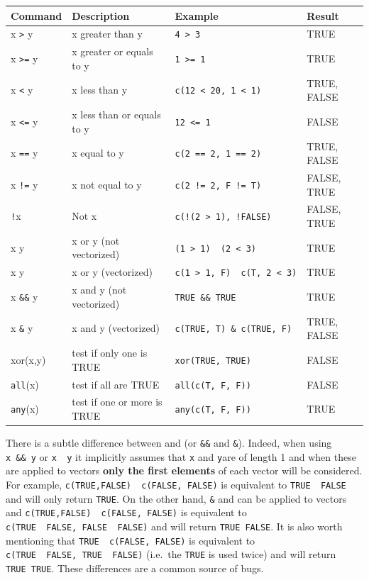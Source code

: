 \documentclass[12pt,]{krantz}
\let\BeginKnitrBlock\begin \let\EndKnitrBlock\end
\begin{document}
\begin{longtable}[]{@{}llll@{}}
\toprule
Command & Description & Example & Result\tabularnewline
\midrule
\endhead
x \texttt{\textgreater{}} y & x greater than y &
\texttt{4\ \textgreater{}\ 3} & TRUE\tabularnewline
x \texttt{\textgreater{}=} y & x greater or equals to y &
\texttt{1\ \textgreater{}=\ 1} & TRUE\tabularnewline
x \texttt{\textless{}} y & x less than y &
\texttt{c(12\ \textless{}\ 20,\ 1\ \textless{}\ 1)} & TRUE,
FALSE\tabularnewline
x \texttt{\textless{}=} y & x less than or equals to y &
\texttt{12\ \textless{}=\ 1} & FALSE\tabularnewline
x \texttt{==} y & x equal to y & \texttt{c(2\ ==\ 2,\ 1\ ==\ 2)} & TRUE,
FALSE\tabularnewline
x \texttt{!=} y & x not equal to y & \texttt{c(2\ !=\ 2,\ F\ !=\ T)} &
FALSE, TRUE\tabularnewline
\texttt{!}x & Not x & \texttt{c(!(2\ \textgreater{}\ 1),\ !FALSE)} &
FALSE, TRUE\tabularnewline
x \texttt{\textbar{}\textbar{}}y & x or y (not vectorized) &
\texttt{(1\ \textgreater{}\ 1)\ \textbar{}\textbar{}\ (2\ \textless{}\ 3)}
& TRUE\tabularnewline
x \texttt{\textbar{}}y & x or y (vectorized) &
\texttt{c(1\ \textgreater{}\ 1,\ F)\ \textbar{}\textbar{}\ c(T,\ 2\ \textless{}\ 3)}
& TRUE\tabularnewline
x \texttt{\&\&} y & x and y (not vectorized) & \texttt{TRUE\ \&\&\ TRUE}
& TRUE\tabularnewline
x \texttt{\&} y & x and y (vectorized) &
\texttt{c(TRUE,\ T)\ \&\ c(TRUE,\ F)} & TRUE, FALSE\tabularnewline
xor(x,y) & test if only one is TRUE & \texttt{xor(TRUE,\ TRUE)} &
FALSE\tabularnewline
\texttt{all}(x) & test if all are TRUE & \texttt{all(c(T,\ F,\ F))} &
FALSE\tabularnewline
\texttt{any}(x) & test if one or more is TRUE &
\texttt{any(c(T,\ F,\ F))} & TRUE\tabularnewline
\bottomrule
\end{longtable}

\BeginKnitrBlock{rmdnote}
There is a subtle difference between \texttt{\textbar{}\textbar{}}and
\texttt{\textbar{}} (or \texttt{\&\&} and \texttt{\&}). Indeed, when
using \texttt{x\ \&\&\ y} or \texttt{x\ \textbar{}\textbar{}\ y} it
implicitly assumes that \texttt{x} and \texttt{y}are of length 1 and
when these are applied to vectors \textbf{only the first elements} of
each vector will be considered. For example,
\texttt{c(TRUE,FALSE)\ \textbar{}\textbar{}\ c(FALSE,\ FALSE)} is
equivalent to \texttt{TRUE\ \textbar{}\textbar{}\ FALSE} and will only
return \texttt{TRUE}. On the other hand, \texttt{\&} and
\texttt{\textbar{}} can be applied to vectors and
\texttt{c(TRUE,FALSE)\ \textbar{}\textbar{}\ c(FALSE,\ FALSE)} is
equivalent to
\texttt{c(TRUE\ \textbar{}\textbar{}\ FALSE,\ FALSE\ \textbar{}\textbar{}\ FALSE)}
and will return \texttt{TRUE\ FALSE}. It is also worth mentioning that
\texttt{TRUE\ \textbar{}\ c(FALSE,\ FALSE)} is equivalent to
\texttt{c(TRUE\ \textbar{}\textbar{}\ FALSE,\ TRUE\ \textbar{}\textbar{}\ FALSE)}
(i.e.~the \texttt{TRUE} is used twice) and will return
\texttt{TRUE\ TRUE}. These differences are a common source of bugs.
\EndKnitrBlock{rmdnote}
\end{document}
